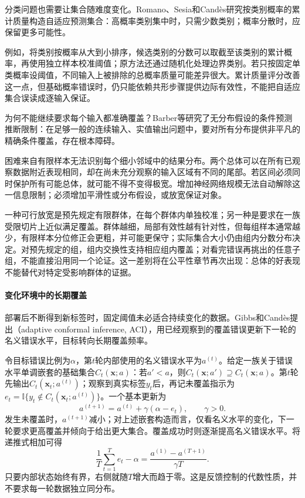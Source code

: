 分类问题也需要让集合随难度变化。Romano、Sesia和Candès研究按类别概率的累计质量构造自适应预测集合：高概率类别集中时，只需少数类别；概率分散时，应保留更多可能性。

例如，将类别按概率从大到小排序，候选类别的分数可以取截至该类别的累计概率，再使用独立样本校准阈值；原方法还通过随机化处理边界类别。若只按固定单类概率设阈值，不同输入上被排除的总概率质量可能差异很大。累计质量评分改善这一点，但基础概率错误时，仍只能依赖共形步骤提供边际有效性，不能把自适应集合误读成逐输入保证。

为何不能继续要求每个输入都准确覆盖？Barber等研究了无分布假设的条件预测推断限制：在足够一般的连续输入、实值输出问题中，要对所有分布提供非平凡的精确条件覆盖，存在根本障碍。

困难来自有限样本无法识别每个细小邻域中的结果分布。两个总体可以在所有已观察数据附近表现相同，却在尚未充分观察的输入区域有不同的尾部。若区间必须同时保护所有可能总体，就可能不得不变得极宽。增加神经网络规模无法自动解除这一信息限制；必须增加平滑性或分布假设，或放宽保证对象。

一种可行放宽是预先规定有限群体，在每个群体内单独校准；另一种是要求在一族受限切片上近似满足覆盖。群体越细，局部有效性越有针对性，但每组样本通常越少，有限样本分位修正会更粗，并可能更保守；实际集合大小仍由组内分数分布决定。对预先规定的组，组内交换性支持相应组内覆盖；对看完错误再挑出的任意子组，不能直接沿用同一个论证。这一差别将在公平性章节再次出现：总体的好表现不能替代对特定受影响群体的证据。

\paragraph{变化环境中的长期覆盖}

部署后不断得到新标签时，固定阈值未必适合持续变化的数据。Gibbs和Candès提出（adaptive conformal inference, ACI），用已经观察到的覆盖错误更新下一轮的名义错误水平，目标转向长期覆盖频率。

令目标错误比例为$\alpha$，第$t$轮内部使用的名义错误水平为$a^{(t)}$。给定一族关于错误水平单调嵌套的基础集合$C_t(\bm{x};a)$：若$a'<a$，则$C_t(\bm{x};a')\supseteq C_t(\bm{x};a)$。第$t$轮先输出$C_t(\bm{x}_t;a^{(t)})$；观察到真实标签$y_t$后，再记未覆盖指示为$e_t=\mathbb I\{y_t\notin C_t(\bm{x}_t;a^{(t)})\}$。一个基本更新为
\begin{equation}
 a^{(t+1)}=a^{(t)}+\gamma(\alpha-e_t),
 \qquad \gamma>0.
 \label{eq:reliability-aci}
\end{equation}
发生未覆盖时，$a^{(t+1)}$减小；对上述嵌套构造而言，仅看名义水平的变化，下一轮要求更高覆盖并倾向于给出更大集合。覆盖成功时则逐渐提高名义错误水平。将递推式相加可得
\[
 \frac1T\sum_{t=1}^{T}e_t-\alpha
 =\frac{a^{(1)}-a^{(T+1)}}{\gamma T}.
\]
只要内部状态始终有界，右侧就随$T$增大而趋于零。这是反馈控制的代数性质，并不要求每一轮数据独立同分布。

